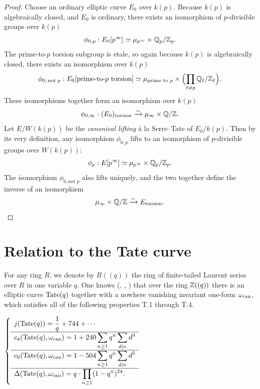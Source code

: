 \begin{proof}
Choose an ordinary elliptic curve $E_0$ over $k(p)$. Because $k(p)$ is algebraically closed, and $E_0$ is ordinary, there exists an isomorphism of $p$-divisible groups over $k(p)$
\[
\phi_{0,p} : E_0[p^{\infty}] \simeq \mu_{p^{\infty}} \times \mathbb{Q}_p/\mathbb{Z}_p .
\]
The prime-to-$p$ torsion subgroup is etale, so again because $k(p)$ is algebraically closed, there exists an isomorphism over $k(p)$
\[
\phi_{0,\, \text{not } p} : E_0[\text{prime-to-}p \text{ torsion}] \simeq \mu_{\text{prime to } p} \times \Bigl(\prod_{\ell \neq p} \mathbb{Q}_{\ell}/\mathbb{Z}_{\ell}\Bigr) .
\]
These isomorphisms together form an isomorphism over $k(p)$
\[
\phi_{0,\infty} : (E_0)_{\mathrm{torsion}} \xrightarrow{\sim} \mu_{\infty} \times \mathbb{Q}/\mathbb{Z} .
\]
Let $E/W(k(p))$ be the \emph{canonical lifting} \`a la Serre--Tate of $E_0/k(p)$. Then by its very definition, any isomorphism $\phi_{0,p}$ lifts to an isomorphism of $p$-divisible groups over $W(k(p))$:
\[
\phi_p : E[p^{\infty}] \simeq \mu_{p^{\infty}} \times \mathbb{Q}_p/\mathbb{Z}_p .
\]
The isomorphism $\phi_{0, \text{not } p}$ also lifts uniquely, and the two together define the inverse of an isomorphism
\[
\mu_{\infty} \times \mathbb{Q}/\mathbb{Z} \xrightarrow{\sim} E_{\mathrm{torsion}} . \qedhere
\]
\end{proof}

\section{Relation to the Tate curve}
\label{sec:8.8}

For any ring $R$, we denote by $R((q))$ the ring of finite-tailed Laurent series over $R$ in one variable $q$. One knows (\cite{Roq}, \cite{DeRa}, \cite{K2}) that over the ring $\mathbb{Z}((q))$ there is an elliptic curve $\mathrm{Tate}(q)$ together with a nowhere vanishing invariant one-form $\omega_{\mathrm{can}}$, which satisfies all of the following properties T.1 through T.4.

\tateprop\label{tate:1}
{\renewcommand{\arraystretch}{1.35}%
\(\displaystyle
\left\{
\begin{array}{l}
\displaystyle j(\mathrm{Tate}(q)) = \frac{1}{q} + 744 + \cdots \\[2pt] \hline
\displaystyle c_4(\mathrm{Tate}(q), \omega_{\mathrm{can}}) = 1 + 240 \sum_{n \ge 1} q^n \sum_{d | n} d^3 \\[2pt] \hline
\displaystyle c_6(\mathrm{Tate}(q), \omega_{\mathrm{can}}) = 1 - 504 \sum_{n \ge 1} q^n \sum_{d | n} d^5 \\[2pt] \hline
\displaystyle \Delta(\mathrm{Tate}(q), \omega_{\mathrm{can}}) = q \cdot \prod_{n \ge 1} (1 - q^n)^{24} .
\end{array}
\right.
\)\par}

